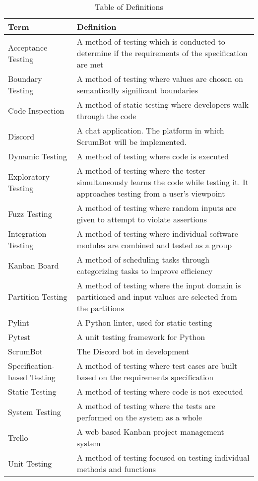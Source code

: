 \documentclass[12pt, titlepage]{article}
\begin{document}
\begin{table}[!htbp]
    \caption{Table of Definitions}
    \label{Table}
    \begin{tabularx}{\textwidth}{p{4cm}X}
        \toprule
        \textbf{Term} & \textbf{Definition}\\
        \midrule
        Acceptance Testing & A method of testing which is conducted to determine if the requirements of the specification are met\\
        Boundary Testing & A method of testing where values are chosen on semantically significant boundaries\\
        Code Inspection & A method of static testing where developers walk through the code\\
        Discord & A chat application. The platform in which ScrumBot will be implemented.\\
        Dynamic Testing & A method of testing where code is executed\\
        Exploratory Testing & A method of testing where the tester simultaneously learns the code while testing it. It approaches testing from a user's viewpoint\\
        Fuzz Testing & A method of testing where random inputs are given to attempt to violate assertions\\
        Integration Testing & A method of testing where individual software modules are combined and tested as a group\\
        Kanban Board & A method of scheduling tasks through categorizing tasks to improve efficiency\\
        Partition Testing & A method of testing where the input domain is partitioned and input values are selected from the partitions\\
        Pylint & A Python linter, used for static testing\\
        Pytest & A unit testing framework for Python\\
        ScrumBot & The Discord bot in development\\
        Specification-based Testing & A method of testing where test cases are built based on the requirements specification\\
        Static Testing & A method of testing where code is not executed\\
        System Testing & A method of testing where the tests are performed on the system as a whole\\
        Trello & A web based Kanban project management system\\
        Unit Testing & A method of testing focused on testing individual methods and functions\\
        \bottomrule
    \end{tabularx}
\end{table}	
\end{document}
